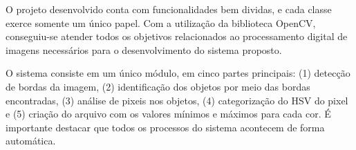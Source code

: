  O projeto desenvolvido conta com funcionalidades bem dividas, e cada classe exerce somente um único papel. Com a utilização da biblioteca OpenCV, conseguiu-se atender todos os objetivos relacionados ao processamento digital de imagens necessários para o desenvolvimento do sistema proposto.

 O sistema consiste em um único módulo, em cinco partes principais: (1) detecção de bordas da imagem, (2) identificação dos objetos por meio das bordas encontradas, (3) análise de pixeis nos objetos, (4) categorização do HSV do pixel e (5) criação do arquivo com os valores mínimos e máximos para cada cor. É importante destacar que todos os processos do sistema acontecem de forma automática.
  
 